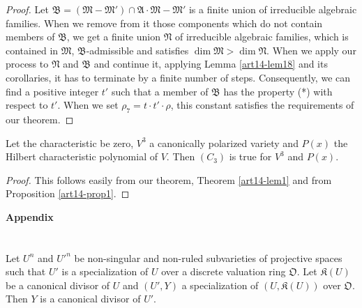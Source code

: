 \begin{proof}
Let $\mathfrak{B}=(\mathfrak{M}-\mathfrak{M}')\cap \mathfrak{A}\cdot \mathfrak{M}-\mathfrak{M}'$ is a finite union of irreducible algebraic families. When we remove from it those components which do not contain members of $\mathfrak{B}$, we get a finite union $\mathfrak{N}$ of irreducible algebraic families, which is contained in $\mathfrak{M}$, $\mathfrak{B}$-admissible and satisfies $\dim \mathfrak{M}>\dim \mathfrak{N}$. When we apply our process to $\mathfrak{N}$ and $\mathfrak{B}$ and continue it, applying Lemma \ref{art14-lem18} and its corollaries, it has to terminate by a finite number of steps. Consequently, we can find a positive integer $t'$ such that a member of $\mathfrak{B}$ has the property (*) with respect to $t'$. When we set $\rho_{7}=t\cdot t'\cdot \rho$, this constant satisfies the requirements of our theorem.
\end{proof}

\begin{coro*}
Let the characteristic be zero, $V^{3}$ a canonically polarized variety and $P(x)$ the Hilbert characteristic polynomial of $V$. Then $(C_{3})$ is true for $V^{3}$ and $P(x)$.
\end{coro*}

\begin{proof}
This follows easily from our theorem, Theorem \ref{art14-lem1} and from Proposition \ref{art14-prop1}.
\end{proof}

\bigskip

\begin{center}
{\Large\bf Appendix}
\end{center}

\setcounter{section}{0}
\section{}\label{art14-app-sec1}
\begin{sublemma}\label{art14-app-lem1.1}
Let $U^{n}$ and ${U'}^{n}$ be non-singular and non-ruled subvarieties of projective spaces such that $U'$ is a specialization of $U$ over a discrete valuation ring $\mathfrak{O}$. Let $\mathfrak{K}(U)$ be a canonical divisor of $U$ and $(U',Y)$ a specialization of $(U,\mathfrak{K}(U))$ over $\mathfrak{O}$. Then $Y$ is a canonical divisor of $U'$.
\end{sublemma}

